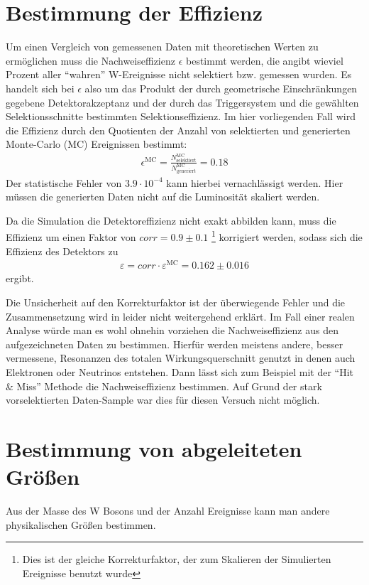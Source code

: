\documentclass[a4paper,12pt]{article}
\begin{document}
\section{Bestimmung der Effizienz}
\label{effizienz}
Um einen Vergleich von gemessenen Daten mit theoretischen Werten zu ermöglichen muss die Nachweiseffizienz
$\epsilon$ bestimmt werden, die angibt wieviel Prozent aller "`wahren"' W-Ereignisse nicht selektiert bzw. gemessen wurden.
Es handelt sich bei $\epsilon$ also um das Produkt der durch geometrische Einschränkungen gegebene Detektorakzeptanz und der
durch das Triggersystem und die gewählten Selektionsschnitte bestimmten Selektionseffizienz. Im hier vorliegenden Fall wird die
Effizienz durch den Quotienten der Anzahl von selektierten und generierten Monte-Carlo (MC) Ereignissen bestimmt:
\begin{align*}
	\epsilon^\text{MC} = \frac{N^\text{MC}_\text{selektiert}}{N^\text{MC}_\text{generiert}} = 0.18
\end{align*}
Der statistische Fehler von $3.9\cdot 10^{-4}$ kann hierbei vernachlässigt werden.
Hier müssen die generierten Daten nicht auf die Luminosität skaliert werden.

Da die Simulation die Detektoreffizienz nicht exakt abbilden kann, muss die Effizienz um einen
Faktor von $corr = 0.9±0.1$
\footnote{Dies ist der gleiche Korrekturfaktor, der zum Skalieren der Simulierten Ereignisse benutzt
wurde}
korrigiert werden, sodass sich die Effizienz des Detektors zu
\begin{align*}
	ε = corr \cdot ε^\text{MC} = 0.162±0.016
\end{align*}
ergibt.

Die Unsicherheit auf den Korrekturfaktor ist der überwiegende Fehler und die Zusammensetzung wird in \cite{versuchsanleitung} leider nicht weitergehend erklärt. Im Fall einer realen Analyse würde man es wohl ohnehin vorziehen die Nachweiseffizienz aus
den aufgezeichneten Daten zu bestimmen. Hierfür werden meistens andere, besser vermessene, Resonanzen des totalen Wirkungsquerschnitt genutzt
in denen auch Elektronen oder Neutrinos entstehen. Dann lässt sich zum Beispiel mit der "`Hit \&
Miss"' Methode die Nachweiseffizienz bestimmen. Auf Grund
der stark vorselektierten Daten-Sample war dies für diesen Versuch nicht möglich.

\newpage
\section{Bestimmung von abgeleiteten Größen}
Aus der Masse des W Bosons und der Anzahl Ereignisse kann man andere physikalischen Größen
bestimmen.
\end{document}

